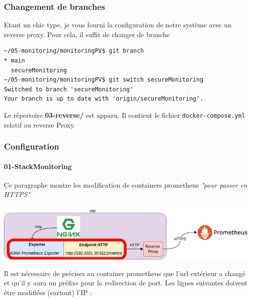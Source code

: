 \documentclass[french, 12pt]{article}%
\begin{document}
\subsubsection{Changement de branches}

Etant un chic type, je vous fourni la configuration de notre système avec un reverse proxy. 
Pour cela, il suffit de changer de branche

\begin{lstlisting}[style=commande] 
~/05-monitoring/monitoringPV$ git branch 
* main
  secureMonitoring
~/05-monitoring/monitoringPV$ git switch secureMonitoring 
Switched to branch 'secureMonitoring'
Your branch is up to date with 'origin/secureMonitoring'.
\end{lstlisting} 

Le répertoire \textbf{03-reverse/} est apparu. Il contient le fichier \verb?docker-compose.yml ? relatif au reverse Proxy. 

\subsubsection{Configuration}

\paragraph{01-StackMonitoring}

Ce paragraphe montre les modification de containers prometheus \textit{"pour passer en HTTPS"}
\begin{center}
\includegraphics[scale=0.5]{./ressource/etapeStackMonitoring.png}
\end{center}

Il est nécessaire de préciser au container prometheus que l'url extérieur a changé et qu'il y aura un préfixe pour la redirection de port. Les lignes suivantes doivent être modifiées (surtout) l'IP : 
\end{document}
